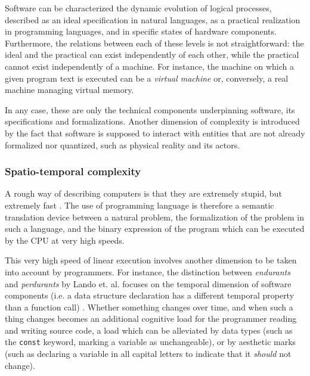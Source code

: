 Software can be characterized the dynamic evolution of logical processes, described as an ideal specification in natural languages, as a practical realization in programming languages, and in specific states of hardware components. Furthermore, the relations between each of these levels is not straightforward: the ideal and the practical can exist independently of each other, while the practical cannot exist independently of a machine. For instance, the machine on which a given program text is executed can be a \emph{virtual machine} or, conversely, a real machine managing virtual memory.

In any case, these are only the technical components underpinning software, its specifications and formalizations. Another dimension of complexity is introduced by the fact that software is supposed to interact with entities that are not already formalized nor quantized, such as physical reality and its actors.

\subsubsection{Spatio-temporal complexity}
\label{subsubsec:types-complexity}

A rough way of describing computers is that they are extremely stupid, but extremely fast \citep{muonray_computer_1985}. The use of programming language is therefore a semantic translation device between a natural problem, the formalization of the problem in such a language, and the binary expression of the program which can be executed by the CPU at very high speeds. 

This very high speed of linear execution involves another dimension to be taken into account by programmers. For instance, the distinction between \emph{endurants} and \emph{perdurants} by Lando et. al. focuses on the temporal dimension of software components (i.e. a data structure declaration has a different temporal property than a function call) \citep{lando_general_2007}. Whether something changes over time, and when such a thing changes becomes an additional cognitive load for the programmer reading and writing source code, a load which can be alleviated by data types (such as the \lstinline{const} keyword, marking a variable as unchangeable), or by aesthetic marks (such as declaring a variable in all capital letters to indicate that it \emph{should} not change).

